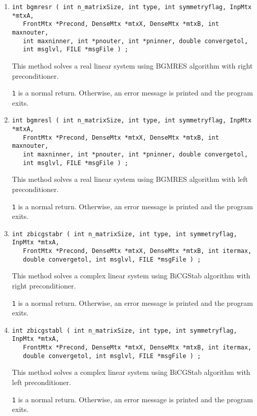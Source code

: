 \begin{enumerate}
\item
\begin{verbatim}
int bgmresr ( int n_matrixSize, int type, int symmetryflag, InpMtx *mtxA,
   FrontMtx *Precond, DenseMtx *mtxX, DenseMtx *mtxB, int maxnouter,
   int maxninner, int *pnouter, int *pninner, double convergetol, 
   int msglvl, FILE *msgFile ) ;
\end{verbatim}
\par
This method solves a real  linear system 
using BGMRES algorithm with right preconditioner. 
\par {}
{\tt 1} is a normal return.  Otherwise, an error message is printed and 
the program exits.

\item
\begin{verbatim}
int bgmresl ( int n_matrixSize, int type, int symmetryflag, InpMtx *mtxA,
   FrontMtx *Precond, DenseMtx *mtxX, DenseMtx *mtxB, int maxnouter,
   int maxninner, int *pnouter, int *pninner, double convergetol, 
   int msglvl, FILE *msgFile ) ;
\end{verbatim}
\par
This method solves a real  linear system 
using BGMRES algorithm with left preconditioner. 
\par {}
{\tt 1} is a normal return.  Otherwise, an error message is printed and 
the program exits.

\item
\begin{verbatim}
int zbicgstabr ( int n_matrixSize, int type, int symmetryflag, InpMtx *mtxA,
   FrontMtx *Precond, DenseMtx *mtxX, DenseMtx *mtxB, int itermax,
   double convergetol, int msglvl, FILE *msgFile ) ;
\end{verbatim}
\par
This method solves a complex linear system using BiCGStab algorithm with right 
preconditioner. 
\par {}
{\tt 1} is a normal return.  Otherwise, an error message is printed and 
the program exits.


\item
\begin{verbatim}
int zbicgstabl ( int n_matrixSize, int type, int symmetryflag, InpMtx *mtxA,
   FrontMtx *Precond, DenseMtx *mtxX, DenseMtx *mtxB, int itermax,
   double convergetol, int msglvl, FILE *msgFile ) ; 
\end{verbatim}
\par
This method solves a complex linear system using BiCGStab algorithm with left 
preconditioner. 
\par {}
{\tt 1} is a normal return.  Otherwise, an error message is printed and 
the program exits.


\end{enumerate}

